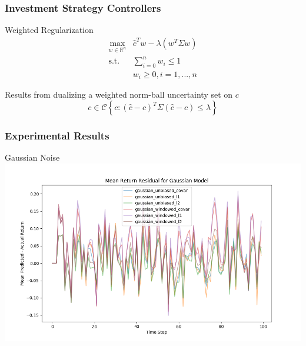 \documentclass{beamer}
\begin{document}
\begin{frame}
\frametitle{Investment Strategy Controllers}

    \begin{block}{Weighted Regularization}
    \begin{align*}
        \max_{w\in\mathbb{R}^n}{} & \hat{c}^T w - \lambda (w^T \Sigma w) \\
        \mbox{s.t.} & \sum_{i=0}^{n} w_i \leq 1 \\
        & w_i \geq 0, i=1,...,n
    \end{align*}
    \end{block}


    \begin{center}
        Results from dualizing a weighted norm-ball uncertainty set on $c$ \\
        \[ c \in \mathcal{C}\left\{ c : (\hat{c} - c)^T \Sigma(\hat{c} - c) \leq \lambda \right\} \]
    \end{center}

\end{frame}

\begin{frame}
\frametitle{Experimental Results}

\begin{block}{Gaussian Noise}
    \includegraphics[width=\linewidth]{mean_return_residual-Gaussian_model.png}
\end{block}

\end{frame}
\end{document}
